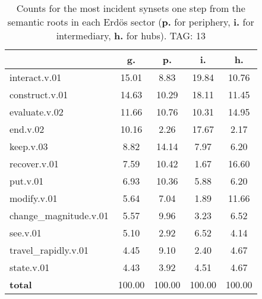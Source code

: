 \begin{table}[h!]
\begin{center}
\begin{tabular}{| l | c | c | c | c |}\hline
 & g. & p. & i. & h. \\\hline
interact.v.01 & 15.01  & 8.83  & 19.84  & 10.76 \\\hline
construct.v.01 & 14.63  & 10.29  & 18.11  & 11.45 \\\hline
evaluate.v.02 & 11.66  & 10.76  & 10.31  & 14.95 \\\hline
end.v.02 & 10.16  & 2.26  & 17.67  & 2.17 \\\hline
keep.v.03 & 8.82  & 14.14  & 7.97  & 6.20 \\\hline
recover.v.01 & 7.59  & 10.42  & 1.67  & 16.60 \\\hline
put.v.01 & 6.93  & 10.36  & 5.88  & 6.20 \\\hline
modify.v.01 & 5.64  & 7.04  & 1.89  & 11.66 \\\hline
change\_magnitude.v.01 & 5.57  & 9.96  & 3.23  & 6.52 \\\hline
see.v.01 & 5.10  & 2.92  & 6.52  & 4.14 \\\hline
travel\_rapidly.v.01 & 4.45  & 9.10  & 2.40  & 4.67 \\\hline
state.v.01 & 4.43  & 3.92  & 4.51  & 4.67 \\\hline
{{\bf total}} & 100.00  & 100.00  & 100.00  & 100.00 \\\hline
\end{tabular}
\caption{Counts for the most incident synsets one step from the semantic roots in each Erd\"os sector ({\bf p.} for periphery, {\bf i.} for intermediary, {\bf h.} for hubs). TAG: 13}
\end{center}
\end{table}